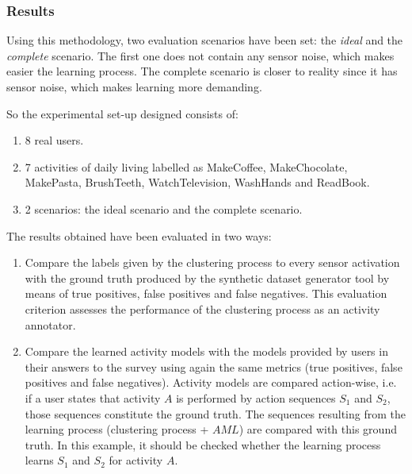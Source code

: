 \subsubsection{Results}
\label{subsubsec:evaluation:eam:results}

Using this methodology, two evaluation scenarios have been set: the \textit{ideal} and the \textit{complete} scenario. The first one does not contain any sensor noise, which makes easier the learning process. The complete scenario is closer to reality since it has sensor noise, which makes learning more demanding.

So the experimental set-up designed consists of: 

\begin{enumerate}
 \item 8 real users.
 \item 7 activities of daily living labelled as MakeCoffee, MakeChocolate, MakePasta, BrushTeeth, WatchTelevision, WashHands and ReadBook. 
 \item 2 scenarios: the ideal scenario and the complete scenario.
\end{enumerate}

The results obtained have been evaluated in two ways: 

\begin{enumerate}
 \item Compare the labels given by the clustering process to every sensor activation with the ground truth produced by the synthetic dataset generator tool by means of true positives, false positives and false negatives. This evaluation criterion assesses the performance of the clustering process as an activity annotator.
 \item Compare the learned activity models with the models provided by users in their answers to the survey using again the same metrics (true positives, false positives and false negatives). Activity models are compared action-wise, i.e. if a user states that activity $A$ is performed by action sequences $S_1$ and $S_2$, those sequences constitute the ground truth. The sequences resulting from the learning process (clustering process + $AML$) are compared with this ground truth. In this example, it should be checked whether the learning process learns $S_1$ and $S_2$ for activity $A$.
\end{enumerate}